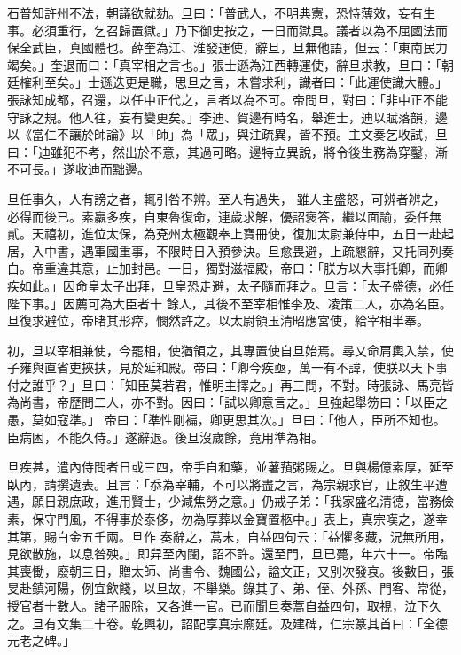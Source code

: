 \begin{pinyinscope}
 石普知許州不法，朝議欲就劾。旦曰：「普武人，不明典憲，恐恃薄效，妄有生事。必須重行，乞召歸置獄。」乃下御史按之，一日而獄具。議者以為不屈國法而保全武臣，真國體也。薛奎為江、淮發運使，辭旦，旦無他語，但云：「東南民力竭矣。」奎退而曰：「真宰相之言也。」張士遜為江西轉運使，辭旦求教，旦曰：「朝
 廷榷利至矣。」士遜迭更是職，思旦之言，未嘗求利，識者曰：「此運使識大體。」張詠知成都，召還，以任中正代之，言者以為不可。帝問旦，對曰：「非中正不能守詠之規。他人往，妄有變更矣。」李迪、賀邊有時名，舉進士，迪以賦落韻，邊以《當仁不讓於師論》以「師」為「眾」，與注疏異，皆不預。主文奏乞收試，旦曰：「迪雖犯不考，然出於不意，其過可略。邊特立異說，將令後生務為穿鑿，漸不可長。」遂收迪而黜邊。



 旦任事久，人有謗之者，輒引咎不辨。至人有過失，
 雖人主盛怒，可辨者辨之，必得而後已。素羸多疾，自東魯復命，連歲求解，優詔褒答，繼以面諭，委任無貳。天禧初，進位太保，為兗州太極觀奉上寶冊使，復加太尉兼侍中，五日一赴起居，入中書，遇軍國重事，不限時日入預參決。旦愈畏避，上疏懇辭，又托同列奏白。帝重違其意，止加封邑。一日，獨對滋福殿，帝曰：「朕方以大事托卿，而卿疾如此。」因命皇太子出拜，旦皇恐走避，太子隨而拜之。旦言：「太子盛德，必任陛下事。」因薦可為大臣者十
 餘人，其後不至宰相惟李及、凌策二人，亦為名臣。旦復求避位，帝睹其形瘁，憫然許之。以太尉領玉清昭應宮使，給宰相半奉。



 初，旦以宰相兼使，今罷相，使猶領之，其專置使自旦始焉。尋又命肩輿入禁，使子雍與直省吏挾扶，見於延和殿。帝曰：「卿今疾亟，萬一有不諱，使朕以天下事付之誰乎？」旦曰：「知臣莫若君，惟明主擇之。」再三問，不對。時張詠、馬亮皆為尚書，帝歷問二人，亦不對。因曰：「試以卿意言之。」旦強起舉笏曰：「以臣之愚，莫如寇準。」
 帝曰：「準性剛褊，卿更思其次。」旦曰：「他人，臣所不知也。臣病困，不能久侍。」遂辭退。後旦沒歲餘，竟用準為相。



 旦疾甚，遣內侍問者日或三四，帝手自和藥，並薯蕷粥賜之。旦與楊億素厚，延至臥內，請撰遺表。且言：「忝為宰輔，不可以將盡之言，為宗親求官，止敘生平遭遇，願日親庶政，進用賢士，少減焦勞之意。」仍戒子弟：「我家盛名清德，當務儉素，保守門風，不得事於泰侈，勿為厚葬以金寶置柩中。」表上，真宗嘆之，遂幸其第，賜白金五千兩。旦作
 奏辭之，蒿末，自益四句云：「益懼多藏，況無所用，見欲散施，以息咎殃。」即舁至內闥，詔不許。還至門，旦已薨，年六十一。帝臨其喪慟，廢朝三日，贈太師、尚書令、魏國公，謚文正，又別次發哀。後數日，張旻赴鎮河陽，例宜飲餞，以旦故，不舉樂。錄其子、弟、侄、外孫、門客、常從，授官者十數人。諸子服除，又各進一官。已而聞旦奏蒿自益四句，取視，泣下久之。旦有文集二十卷。乾興初，詔配享真宗廟廷。及建碑，仁宗篆其首曰：「全德元老之碑。」




\end{pinyinscope}
